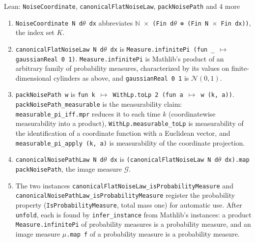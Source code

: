 \documentclass[11pt,a4paper]{article}
\begin{document}
\begin{leanbox}{Lean: \texttt{NoiseCoordinate}, \texttt{canonicalFlatNoiseLaw}, \texttt{packNoisePath} and 4 more}
\begin{enumerate}
\item \texttt{Noise\allowbreak{}Coordinate N d\ensuremath{\theta} dx} abbreviates \texttt{\ensuremath{\mathbb N} \ensuremath{\times} (Fin d\ensuremath{\theta} ⊕ (Fin N \ensuremath{\times} Fin dx))}, the index set \(K\).

\item \texttt{canonical\allowbreak{}Flat\allowbreak{}Noise\allowbreak{}Law N d\ensuremath{\theta} dx} is \texttt{Measure.\allowbreak{}infinite\allowbreak{}Pi (fun \_\allowbreak{} \ensuremath{\mapsto} gaussian\allowbreak{}Real 0 1)}. \texttt{Measure.\allowbreak{}infinite\allowbreak{}Pi} is Mathlib's product of an arbitrary family of probability measures, characterized by its values on finite-dimensional cylinders as above, and \texttt{gaussian\allowbreak{}Real 0 1} is \(\mathcal N(0,1)\).

\item \texttt{pack\allowbreak{}Noise\allowbreak{}Path w} is \texttt{fun k \ensuremath{\mapsto} With\allowbreak{}Lp.\allowbreak{}to\allowbreak{}Lp 2 (fun a \ensuremath{\mapsto} w (k, a))}. \texttt{pack\allowbreak{}Noise\allowbreak{}Path\_\allowbreak{}measurable} is the measurability claim: \texttt{measurable\_\allowbreak{}pi\_\allowbreak{}iff.\allowbreak{}mpr} reduces it to each time \(k\) (coordinatewise measurability into a product), \texttt{With\allowbreak{}Lp.\allowbreak{}measurable\_\allowbreak{}to\allowbreak{}Lp} is measurability of the identification of a coordinate function with a Euclidean vector, and \texttt{measurable\_\allowbreak{}pi\_\allowbreak{}apply (k, a)} is measurability of the coordinate projection.

\item \texttt{canonical\allowbreak{}Noise\allowbreak{}Path\allowbreak{}Law N d\ensuremath{\theta} dx} is \texttt{(canonical\allowbreak{}Flat\allowbreak{}Noise\allowbreak{}Law N d\ensuremath{\theta} dx).\allowbreak{}map pack\allowbreak{}Noise\allowbreak{}Path}, the image measure \(\mathcal G\).

\item The two instances \texttt{canonical\allowbreak{}Flat\allowbreak{}Noise\allowbreak{}Law\_\allowbreak{}is\allowbreak{}Probability\allowbreak{}Measure} and \texttt{canonical\allowbreak{}Noise\allowbreak{}Path\allowbreak{}Law\_\allowbreak{}is\allowbreak{}Probability\allowbreak{}Measure} register the probability property (\texttt{Is\allowbreak{}Probability\allowbreak{}Measure}, total mass one) for automatic use. After \texttt{unfold}, each is found by \texttt{infer\_\allowbreak{}instance} from Mathlib's instances: a product \texttt{Measure.\allowbreak{}infinite\allowbreak{}Pi} of probability measures is a probability measure, and an image measure \texttt{\ensuremath{\mu}.\allowbreak{}map f} of a probability measure is a probability measure.

\end{enumerate}
\end{leanbox}
\end{document}
